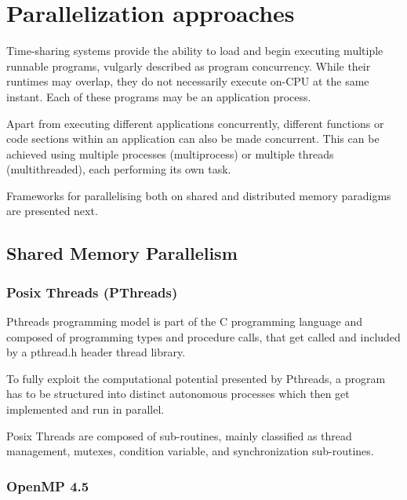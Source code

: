 \documentclass[
  oneside,
  11pt, a4paper,
  footinclude=true,
  headinclude=true,
  cleardoublepage=empty
]{scrbook}
\begin{document}
\section{Parallelization approaches}

Time-sharing systems provide 
the ability to load and begin executing multiple runnable programs, vulgarly described as program concurrency. While
their runtimes may overlap, they do not necessarily execute on-CPU at the same
instant. Each of these programs may be an application process.\par 

Apart from executing different applications concurrently, different functions or code sections
within an application can also be made concurrent. This can be achieved using
multiple processes (multiprocess) or multiple threads (multithreaded), each performing
its own task.\par 

Frameworks for parallelising both on shared and distributed memory paradigms are presented next.


\subsection{Shared Memory Parallelism}

\subsubsection{Posix Threads (PThreads)}


Pthreads programming model is part of the C programming language and composed of programming types and procedure calls, that get called and included by a pthread.h header thread library. \par 
To fully exploit the computational potential presented by Pthreads, a program has to be structured into distinct autonomous processes which then get implemented and run in parallel. \par
Posix Threads are composed of  sub-routines, mainly classified as thread management, mutexes,
condition variable, and synchronization sub-routines.

\subsubsection{OpenMP 4.5}
\end{document}
